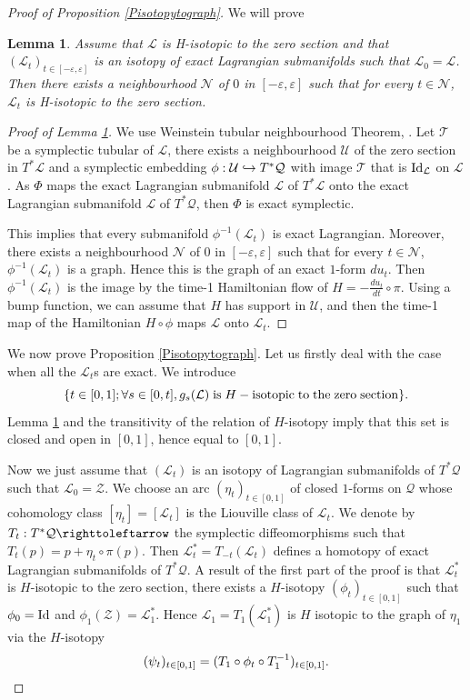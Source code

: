 \documentclass[JEP,XML,SOM,Unicode,published]{cedram}
\def\hto{\mathrel{\lhook\joinrel\to}}
\newtheorem{lemma}{Lemma}
\theoremstyle{definition}
\def\cL{{\mathcal L}}
\def\cN{{\mathcal N}}
\def\cQ{{\mathcal Q}}
\def\cT{{\mathcal T}}
\def\cU{{\mathcal U}}
\def\cZ{{\mathcal Z}}
\begin{document}
\begin{proof}[Proof of Proposition \ref{Pisotopytograph}]
We will prove
\begin{lemma}\label{Lisotexactlagr}
Assume that $\cL$ is H-isotopic to the zero section and that $(\cL_t)_{t\in[-\varepsilon, \varepsilon]}$ is an isotopy of exact Lagrangian submanifolds such that $\cL_0=\cL$. Then there exists a neighbourhood $\cN$ of $0$ in $[-\varepsilon, \varepsilon]$ such that for every $t\in\cN$, $\cL_t$ is H-isotopic to the zero section.
\end{lemma}

\begin{proof}[Proof of Lemma \ref{Lisotexactlagr}]
We use Weinstein tubular neighbourhood Theorem, \cite{Weinstein1977}. Let $\cT$ be a symplectic tubular of $\cL$, \ie there exists a neighbourhood $\cU$ of the zero section in $T^*\cL$ and a symplectic embedding $\phi:\cU \hto T^*\cQ$ with image $\cT$ that is ${\rm Id}_{\cL}$ on $\cL$. As $\Phi$ maps the exact Lagrangian submanifold $\cL$ of $T^*\cL$ onto the exact Lagrangian submanifold $\cL$ of $T^*\cQ$, then $\Phi$ is exact symplectic.

This implies that every submanifold $\phi^{-1}(\cL_t)$ is exact Lagrangian. Moreover, there exists a neighbourhood $\cN$ of $0$ in $[-\varepsilon, \varepsilon]$ such that for every $t\in\cN$, $\phi^{-1}(\cL_t)$ is a graph. Hence this is the graph of an exact $1$-form $du_t$. Then $\phi^{-1}(\cL_t)$ is the image by the time-1 Hamiltonian flow of $H=-\frac{du_t}{dt}\circ \pi$. Using a bump function, we can assume that $H$ has support in $\cU$, and then the time-1 map of the Hamiltonian $H\circ\phi$ maps $\cL$ onto $\cL_t$.
\end{proof}

We now prove Proposition \ref{Pisotopytograph}. Let us firstly deal with the case when all the $\cL_t$s are exact. We introduce
\[
\{ t\in[0, 1]; \forall s\in [0, t], g_s(\cL)\;{\rm is}\; H-{\rm isotopic}\;{\rm to}\;{\rm the}\;{\rm zero}\;{\rm section}\}.
\]
Lemma \ref{Lisotexactlagr} and the transitivity of the relation of $H$-isotopy imply that this set is closed and open in $[0, 1]$, hence equal to $[0,1]$.

Now we just assume that $(\cL_t)$ is an isotopy of Lagrangian submanifolds of $T^*\cQ$ such that $\cL_0=\cZ$. We choose an arc $(\eta_t)_{t\in[0,1]}$ of closed $1$-forms on $\cQ$ whose cohomology class $[\eta_t]=[\cL_t]$ is the Liouville class of $\cL_t$. We denote by $T_t:T^*\cQ\righttoleftarrow$ the symplectic diffeomorphisms such that $T_t(p)=p+\eta_t\circ\pi (p)$. Then $\cL^*_t=T_{-t}(\cL_t)$ defines a homotopy of exact Lagrangian submanifolds of $T^*\cQ$. A result of the first part of the proof is that $\cL^*_t$ is $H$-isotopic to the zero section, \ie there exists a $H$-isotopy $(\phi_t)_{t\in[0, 1]}$ such that $\phi_0={\rm Id}$ and $\phi_1(\cZ)=\cL^*_1$. Hence $\cL_1=T_1(\cL^*_1)$ is $H$ isotopic to the graph of $\eta_1$ via the $H$-isotopy
\[
(\psi_t)_{t\in[0,1]}=(T_1\circ \phi_t\circ T_1^{-1})_{t\in[0, 1]}.\qedhere
\]
\end{proof}
\end{document}
